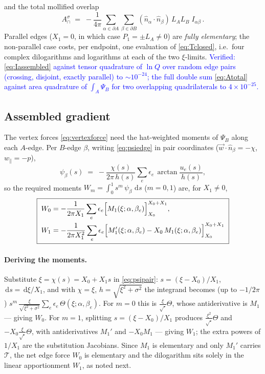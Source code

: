 \documentclass[11pt]{article}
\newcommand{\aside}[1]{\textcolor{blue}{#1}}
\newcommand{\atan}{\operatorname{arctan}}
\newcommand{\dd}{\,\mathrm{d}}
\newcommand{\Acap}{A^{\sigma}_{\cap}}
\begin{document}
\noindent and the total mollified overlap
\begin{equation}
  \Acap \;=\; -\frac{1}{4\pi}\sum_{\alpha\in\partial A}\sum_{\beta\in\partial B}
  (\hat n_\alpha\!\cdot\!\hat n_\beta)\,L_A L_B\; I_{\alpha\beta}\, .
  \label{eq:Atotal}
\end{equation}
Parallel edges ($X_1=0$, in which case $P_1=\pm L_A\neq0$) are \emph{fully
elementary}; the non-parallel case costs, per endpoint, one evaluation of
\eqref{eq:Tclosed}, i.e.\ four complex dilogarithms and logarithms at each of the two
$\xi$-limits.  \aside{Verified: \eqref{eq:Iassembled} against tensor quadrature of
$\ln Q$ over random edge pairs (crossing, disjoint, exactly parallel) to
$\sim10^{-24}$; the full double sum \eqref{eq:Atotal} against area quadrature of
$\int_A\Psi_B$ for two overlapping quadrilaterals to $4\times10^{-25}$.}

\subsection{Assembled gradient}
\label{sec:gradassembled}

The vertex forces \eqref{eq:vertexforce} need the hat-weighted moments of
$\Psi_B$ along each $A$-edge.  Per $B$-edge $\beta$, writing \eqref{eq:psiedge} in
pair coordinates ($\vec w\cdot\hat n_\beta = -\chi$, $w_\parallel=-p$),
\begin{equation}
  \psi_\beta(s) \;=\; -\frac{\chi(s)}{2\pi\,h(s)}
  \sum_{e}\epsilon_e\,\atan\frac{u_e(s)}{h(s)},
  \label{eq:psipair}
\end{equation}
so the required moments $W_m=\int_0^1 s^m\,\psi_\beta\,\dd s$ ($m=0,1$) are, for
$X_1\neq0$,
\begin{equation}
  \boxed{\;
  \begin{aligned}
  W_0 &= -\frac{1}{2\pi X_1}\sum_e \epsilon_e
        \Bigl[M_1(\xi;\alpha,\beta_e)\Bigr]_{X_0}^{X_0+X_1},\\
  W_1 &= -\frac{1}{2\pi X_1^2}\sum_e \epsilon_e
        \Bigl[M_1'(\xi;\alpha,\beta_e)-X_0\,M_1(\xi;\alpha,\beta_e)
        \Bigr]_{X_0}^{X_0+X_1}
  \end{aligned}\;}
  \label{eq:Wclosed}
\end{equation}

\paragraph{Deriving the moments.}  Substitute $\xi=\chi(s)=X_0+X_1s$ in
\eqref{eq:psipair}: $s=(\xi-X_0)/X_1$, $\dd s=\dd\xi/X_1$, and with $\chi=\xi$,
$h=\sqrt{\xi^2+\sigma^2}$ the integrand becomes (up to $-1/2\pi$)
$s^m\,\tfrac{\xi}{\sqrt{\xi^2+\sigma^2}}\sum_e\epsilon_e\,\Theta(\xi;\alpha,\beta_e)$.
For $m=0$ this is $\tfrac{\xi}{\sqrt{\cdot}}\Theta$, whose antiderivative is $M_1$ ---
giving $W_0$.  For $m=1$, splitting $s=(\xi-X_0)/X_1$ produces
$\tfrac{\xi^2}{\sqrt{\cdot}}\Theta$ and $-X_0\tfrac{\xi}{\sqrt{\cdot}}\Theta$, with
antiderivatives $M_1'$ and $-X_0M_1$ --- giving $W_1$; the extra powers of $1/X_1$ are
the substitution Jacobians.  Since $M_1$ is elementary and only $M_1'$ carries
$\mathcal T$, the net edge force $W_0$ is elementary and the dilogarithm sits solely in
the linear apportionment $W_1$, as noted next.
\end{document}

